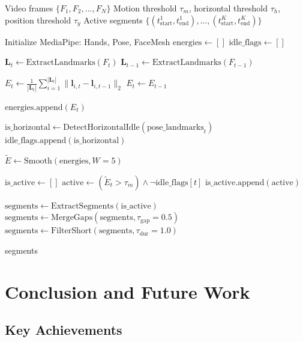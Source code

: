\documentclass[11pt,a4paper]{article}
\begin{document}
\begin{algorithm}
\caption{Sign Activity Detection}
\begin{algorithmic}[1]
\Require Video frames $\{F_1, F_2, \ldots, F_N\}$
\Require Motion threshold $\tau_m$, horizontal threshold $\tau_h$, position threshold $\tau_y$
\Ensure Active segments $\{(t_{\text{start}}^1, t_{\text{end}}^1), \ldots, (t_{\text{start}}^K, t_{\text{end}}^K)\}$

\State Initialize MediaPipe: Hands, Pose, FaceMesh
\State $\text{energies} \gets []$
\State $\text{idle\_flags} \gets []$

    \State $\mathbf{L}_t \gets \text{ExtractLandmarks}(F_t)$ 
    \State $\mathbf{L}_{t-1} \gets \text{ExtractLandmarks}(F_{t-1})$
    
        \State $E_t \gets \frac{1}{|\mathbf{L}_t|} \sum_{i=1}^{|\mathbf{L}_t|} \|\mathbf{l}_{i,t} - \mathbf{l}_{i,t-1}\|_2$
    \Else
        \State $E_t \gets E_{t-1}$ 
    \EndIf
    
    \State $\text{energies.append}(E_t)$
    
    \State $\text{is\_horizontal} \gets \text{DetectHorizontalIdle}(\text{pose\_landmarks}_t)$
    \State $\text{idle\_flags.append}(\text{is\_horizontal})$
\EndFor

\State $\tilde{E} \gets \text{Smooth}(\text{energies}, W=5)$ 

\State $\text{is\_active} \gets []$
    \State $\text{active} \gets (\tilde{E}_t > \tau_m) \wedge \neg \text{idle\_flags}[t]$
    \State $\text{is\_active.append}(\text{active})$
\EndFor

\State $\text{segments} \gets \text{ExtractSegments}(\text{is\_active})$
\State $\text{segments} \gets \text{MergeGaps}(\text{segments}, \tau_{\text{gap}}=0.5)$
\State $\text{segments} \gets \text{FilterShort}(\text{segments}, \tau_{\text{dur}}=1.0)$

\State \Return segments
\end{algorithmic}
\end{algorithm}

\section{Conclusion and Future Work}

\subsection{Key Achievements}
\end{document}
